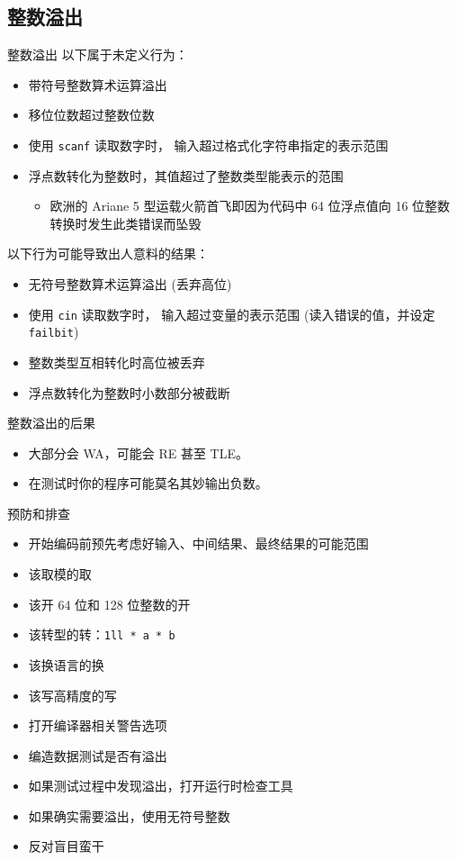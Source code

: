 \documentclass[10pt,mathserif]{beamer}
\begin{document}
\subsection{整数溢出}
\begin{frame}{整数溢出}
	以下属于未定义行为：
	\begin{itemize}
		\item 带符号整数算术运算溢出
		\item 移位位数超过整数位数
		\item 使用 \lstinline{scanf} 读取数字时，
			输入超过格式化字符串指定的表示范围
		\item 浮点数转化为整数时，其值超过了整数类型能表示的范围
			\begin{itemize}
				\item<2> 欧洲的 Ariane 5 型运载火箭首飞即因为代码中
					64 位浮点值向 16 位整数转换时发生此类错误而坠毁
			\end{itemize}
	\end{itemize}
	以下行为可能导致出人意料的结果：
	\begin{itemize}
		\item 无符号整数算术运算溢出 (丢弃高位)
		\item 使用 \lstinline{cin} 读取数字时，
			输入超过变量的表示范围 (读入错误的值，并设定
			\lstinline{failbit})
		\item 整数类型互相转化时高位被丢弃
		\item 浮点数转化为整数时小数部分被截断
	\end{itemize}
\end{frame}

\begin{frame}{整数溢出的后果}
	\begin{itemize}
		\item 大部分会 WA，可能会 RE 甚至 TLE。
		\item 在测试时你的程序可能莫名其妙输出负数。
	\end{itemize}
	
\end{frame}

\begin{frame}{预防和排查}
	\begin{itemize}
		\item 开始编码前预先考虑好输入、中间结果、最终结果的可能范围
		\item 该取模的取
		\item 该开 64 位和 128 位整数的开
		\item 该转型的转：\lstinline!1ll * a * b!
		\item 该换语言的换
		\item 该写高精度的写
		\item 打开编译器相关警告选项
		\item 编造数据测试是否有溢出
		\item 如果测试过程中发现溢出，打开运行时检查工具
		\item 如果确实需要溢出，使用无符号整数
		\item 反对盲目蛮干
	\end{itemize}
\end{frame}
\end{document}
